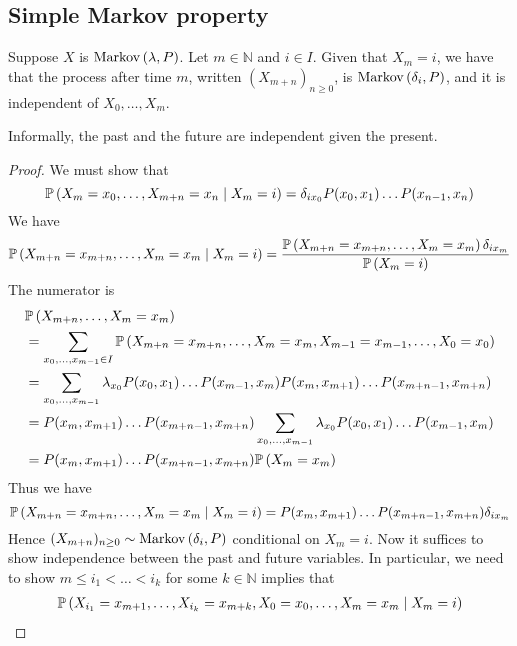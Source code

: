 \subsection{Simple Markov property}
\begin{theorem}
	Suppose \( X \) is \( \operatorname{Markov}\left({\lambda, P}\right) \).
	Let \( m \in \mathbb N \) and \( i \in I \).
	Given that \( X_m = i \), we have that the process after time \( m \), written \( (X_{m+n})_{n \geq 0} \), is \( \operatorname{Markov}\left({\delta_i, P}\right) \), and it is independent of \( X_0, \dots, X_m \).
\end{theorem}
\noindent Informally, the past and the future are independent given the present.
\begin{proof}
	We must show that
	\[
		\mathbb{P}\left({X_m = x_0, \dots, X_{m+n} = x_n \mid X_m = i}\right) = \delta_{i x_0} P(x_0, x_1) \dots P(x_{n-1}, x_n)
	\]
	We have
	\[
		\mathbb{P}\left({X_{m+n} = x_{m+n}, \dots, X_m = x_m \mid X_m = i}\right)
		= \frac{\mathbb{P}\left({X_{m+n} = x_{m+n}, \dots, X_m = x_m}\right) \delta_{i x_m}}{\mathbb{P}\left({X_m = i}\right)}
	\]
	The numerator is
	\begin{align*}
		 & \mathbb{P}\left({X_{m+n}, \dots, X_m = x_m}\right)                                                                                         \\ & = \sum_{x_0, \dots, x_{m-1} \in I} \mathbb{P}\left({X_{m+n} = x_{m+n}, \dots, X_m = x_m, X_{m-1} = x_{m-1}, \dots, X_0 = x_0}\right)       \\
		 & = \sum_{x_0, \dots, x_{m-1}} \lambda_{x_0} P(x_0, x_1) \dots P(x_{m-1}, x_m) P(x_m, x_{m+1}) \dots P(x_{m+n-1}, x_{m+n}) \\
		 & = P(x_m, x_{m+1}) \dots P(x_{m+n-1}, x_{m+n}) \sum_{x_0, \dots, x_{m-1}} \lambda_{x_0} P(x_0, x_1) \dots P(x_{m-1}, x_m) \\
		 & = P(x_m, x_{m+1}) \dots P(x_{m+n-1}, x_{m+n}) \mathbb{P}\left({X_m = x_m}\right)                                                           \\
	\end{align*}
	Thus we have
	\[
		\mathbb{P}\left({X_{m+n} = x_{m+n}, \dots, X_m = x_m \mid X_m = i}\right)
		= P(x_m, x_{m+1}) \dots P(x_{m+n-1}, x_{m+n}) \delta_{i x_m}
	\]
	Hence \( (X_{m+n})_{n \geq 0} \sim \operatorname{Markov}\left({\delta_i, P}\right) \) conditional on \( X_m = i \).
	Now it suffices to show independence between the past and future variables.
	In particular, we need to show \( m \leq i_1 < \dots < i_k \) for some \( k \in \mathbb N \) implies that
	\begin{align*}
		 & \prob{X_{i_1} = x_{m+1}, \dots, X_{i_k} = x_{m+k}, X_0 = x_0, \dots, X_m = x_m \mid X_m = i}                                               \\

\end{align*}
\end{proof}
